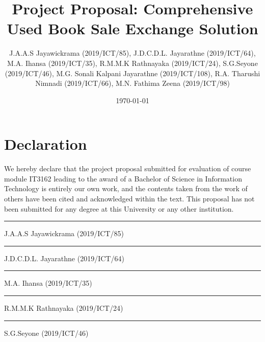 \documentclass{article}
\begin{document}
\title{Project Proposal: Comprehensive Used Book Sale Exchange Solution}
\author{J.A.A.S Jayawickrama (2019/ICT/85), J.D.C.D.L. Jayarathne (2019/ICT/64), M.A. Ihansa (2019/ICT/35),
R.M.M.K Rathnayaka (2019/ICT/24), S.G.Seyone (2019/ICT/46), M.G. Sonali Kalpani Jayarathne (2019/ICT/108),
R.A. Tharushi Nimnadi (2019/ICT/66), M.N. Fathima Zeena (2019/ICT/98)}
\date{ \today }
\maketitle

\newpage

\section*{Declaration}
We hereby declare that the project proposal submitted for evaluation of
course module IT3162 leading to the award of a Bachelor of Science in
Information Technology is entirely our own work, and the contents taken from
the work of others have been cited and acknowledged within the text. This
proposal has not been submitted for any degree at this University or any other
institution.

\vspace{2cm} %
\rule{5cm}{0.5pt} %
\linebreak
J.A.A.S Jayawickrama (2019/ICT/85)

\vspace{2cm} %
\rule{5cm}{0.5pt} %
\linebreak
J.D.C.D.L. Jayarathne (2019/ICT/64)

\vspace{2cm} %
\rule{5cm}{0.5pt} %
\linebreak
M.A. Ihansa (2019/ICT/35)

\vspace{2cm} %
\rule{5cm}{0.5pt} %
\linebreak
R.M.M.K Rathnayaka (2019/ICT/24)

\vspace{2cm} %
\rule{5cm}{0.5pt} %
\linebreak
S.G.Seyone (2019/ICT/46)
\end{document}
